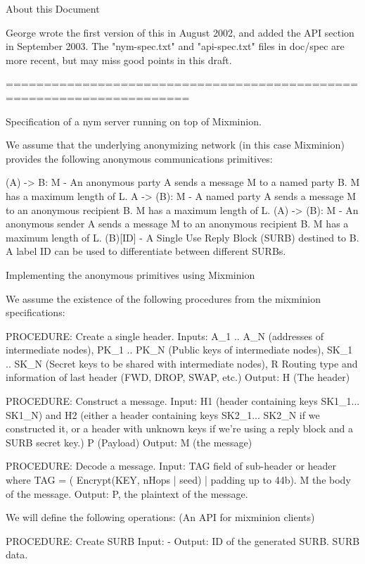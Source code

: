 About this Document

   George wrote the first version of this in August 2002, and added
   the API section in September 2003.  The "nym-spec.txt" and
   "api-spec.txt" files in doc/spec are more recent, but may miss
   good points in this draft.

======================================================================

Specification of a nym server running on top of Mixminion.

We assume that the underlying anonymizing network (in this case
Mixminion) provides the following anonymous communications
primitives:

(A) -> B: M   - An anonymous party A sends a message M to a named party
                B. M has a maximum length of L.
A -> (B): M   - A named party A sends a message M to an anonymous
                recipient B. M has a maximum length of L.
(A) -> (B): M - An anonymous sender A sends a message M to an
                anonymous recipient B. M has a maximum length of L.
(B)[ID]       - A Single Use Reply Block (SURB) destined to B. A label
                ID can be used to differentiate between different
                SURBs.

Implementing the anonymous primitives using Mixminion

We assume the existence of the following procedures from the mixminion
specifications: 

PROCEDURE: Create a single header.
Inputs: A_1 .. A_N (addresses of intermediate nodes), 
	PK_1 .. PK_N (Public keys of intermediate nodes),
	SK_1 .. SK_N (Secret keys to be shared with intermediate nodes),
        R Routing type and information of last header (FWD, DROP, SWAP, etc.)
Output: H (The header)

PROCEDURE: Construct a message.
Input: H1 (header containing keys SK1_1... SK1_N)
       and H2 (either a header containing keys SK2_1... SK2_N if
         we constructed it, or a header with unknown keys if we're
         using a reply block and a SURB secret key.)
       P (Payload)
Output: M (the message)

PROCEDURE: Decode a message.
Input:  TAG field of sub-header or header where 
        TAG = ( Encrypt(KEY, nHops | seed) | padding up to 44b).
        M the body of the message.
Output: P, the plaintext of the message.


We will define the following operations:
(An API for mixminion clients)

PROCEDURE: Create SURB
Input: -
Output: ID of the generated SURB. 
	SURB data.

